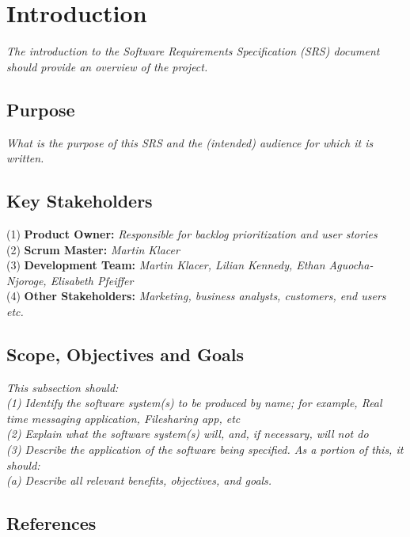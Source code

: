 \section{Introduction}

\textit{The introduction to the Software Requirements Specification (SRS) document should provide an overview of the project.}

\subsection{Purpose}

\textit{What is the purpose of this SRS and the (intended) audience for which it is written.}

\subsection{Key Stakeholders}

(1) \textbf{Product Owner:} \textit{Responsible for backlog prioritization and user stories} \\
(2) \textbf{Scrum Master:} \textit{Martin Klacer} \\
(3) \textbf{Development Team:} \textit{Martin Klacer, Lilian Kennedy, Ethan Aguocha-Njoroge, Elisabeth Pfeiffer} \\
(4) \textbf{Other Stakeholders:} \textit{Marketing, business analysts, customers, end users etc.} \\

\subsection{Scope, Objectives and Goals}

\textit{This subsection should:} \\
\textit{(1) Identify the software system(s) to be produced by name; for example, Real time messaging application, Filesharing app, etc} \\
\textit{(2) Explain what the software system(s) will, and, if necessary, will not do} \\
\textit{(3) Describe the application of the software being specified. As a portion of this, it should:} \\
\textit{  (a) Describe all relevant benefits, objectives, and goals.} \\

\subsection{References}

